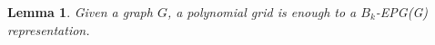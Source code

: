 \documentclass[a4paper,11pt]{article}
\newtheorem{theorem}{Theorem}
\newtheorem{lema}[theorem]{Lemma}
\begin{document}



\begin{lema}
Given a graph $G$, a polynomial grid is enough to a $B_k$-EPG(G) representation. %
\end{lema}
\end{document}
